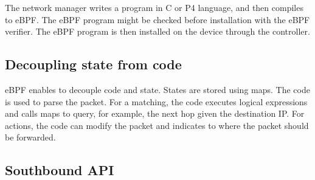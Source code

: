 The network manager writes a program in C or P4 language, and then compiles to eBPF. The eBPF program might be checked before installation with the eBPF verifier. The eBPF program is then installed on the device through the controller.


\subsection{Decoupling state from code}
\label{sec:selfpopulate}

eBPF enables to decouple code and state.
States are stored using maps.
The code is used to parse the packet.
For a matching, the code executes logical expressions and calls maps to query, for example, the next hop given the destination IP.
For actions, the code can modify the packet and indicates to where the packet should be forwarded.



\subsection{Southbound API}
\label{sec:southboundAPI}

